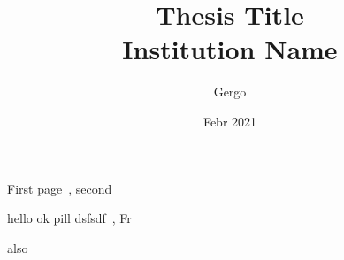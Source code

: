 \documentclass[15pt, twoside]{report}
\title{
	{Thesis Title}\\
	{\large Institution Name}
}
\author{Gergo}
\date{Febr 2021}
\begin{document}
First page~\cite{2010_Hargather_CONF}, second~\cite{2019_Hahn}

hello ok pill dsfsdf~\cite{2020_Ibolya_CONF}, Fr~\cite{2007_Frolkovic}~\cite{2014_Mikula}

also \cite{1985_Yee}
\printbibliography[]
\end{document}
